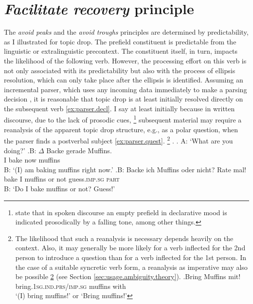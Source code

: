 \section{\textit{Facilitate recovery} principle}\label{sec:resolving}
The \textit{avoid peaks} and the \textit{avoid troughs} principles are determined by predictability,  as I illustrated for topic drop.
The prefield constituent is predictable  from the linguistic or extralinguistic precontext.
The constituent itself, in turn, impacts the likelihood of the following verb.
However, the processing effort on this verb is not only associated with its predictability  but also with the process of ellipsis resolution, which can only take place after the ellipsis is identified.
Assuming an incremental parser,  which uses any incoming data immediately to make a parsing decision \citep{marslen-wilson1973, marslen-wilson1975,altmann.kamide1999}, it is reasonable that topic drop is at least initially resolved directly on the subsequent verb \ref{ex:parser.decl}.
I say at least initially because in written discourse, due to the lack of prosodic cues,%
\footnote{\citet[415]{zifonun.etal1997} state that in spoken discourse an empty prefield in declarative mood is indicated prosodically  by a falling tone, among other things.
}
%
 subsequent material may require a reanalysis of the apparent topic drop structure, e.g., as a polar question, when the parser  finds a postverbal subject \ref{ex:parser.quest}.%
\footnote{The likelihood that such a reanalysis is necessary depends heavily on the context.
Also, it may generally be more likely for a verb inflected for the 2nd person to introduce a question than for a verb inflected for the 1st person.
In the case of a suitable syncretic  verb form, a reanalysis as imperative  may also be possible \ref{ex:parser.syn} (see Section \ref{sec:usage.ambiguity.theory}).
\exg.\label{ex:parser.syn}Bring Muffins mit!\\
bring.\textsc{1sg.ind.prs}/\textsc{imp.sg} muffins with\\
`(I) bring muffins!' or `Bring muffins!'

}%
\ex.\label{ex:parser}
\a. A: `What are you doing?'
\bg.\label{ex:parser.decl}B: $\Delta$ Backe gerade Muffins.\\
{} I bake now muffins\\
B: `(I) am baking muffins right now.'
\cg.\label{ex:parser.quest}B: Backe ich Muffins oder nicht? Rate mal!\\
{} bake I muffins or not guess.\textsc{imp.sg} \textsc{part}\\
B: `Do I bake muffins or not? Guess!'


